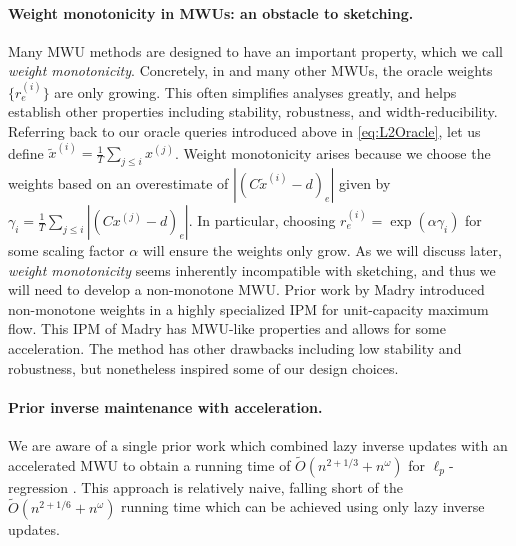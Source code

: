 \documentclass[11pt]{article}
\newcommand\dd{\boldsymbol{\mathit{d}}}
\newcommand\rr{\boldsymbol{\mathit{r}}}
\newcommand\xx{\boldsymbol{\mathit{x}}}
\newcommand\xxtil{\widetilde{\boldsymbol{\mathit{x}}}}
\newcommand\CC{\boldsymbol{\mathit{C}}}
\newcommand\Otil{\widetilde{O}}
\begin{document}
\paragraph{Weight monotonicity in MWUs: an obstacle to sketching.}
Many MWU methods are designed to have an important property, which we call \emph{weight monotonicity}.
Concretely, in \cite{christiano2011electrical} and many other MWUs, the oracle weights $\{\rr_e^{(i)}\}$ are only growing.
This often simplifies analyses greatly, and helps establish other properties including stability, robustness, and width-reducibility.
Referring back to our oracle queries introduced above in \eqref{eq:L2Oracle}, let us define
$\xxtil^{(i)} = \frac{1}{T}\sum_{j \leq i} \xx^{(j)}$.
Weight monotonicity arises because we choose the weights based on an overestimate of 
$|(\CC\xxtil^{(i)}-\dd)_e|$ given by $\gamma_i = \frac{1}{T}\sum_{j \leq i} |(\CC\xx^{(j)}-\dd)_e|$.
In particular, choosing $\rr_e^{(i)}= \exp(\alpha \gamma_i)$ for some scaling factor $\alpha$ 
will ensure the weights only grow.
As we will discuss later, \emph{weight monotonicity} seems inherently incompatible with sketching, and thus we will need to develop a non-monotone MWU.
Prior work by Madry \cite{M13,madry2016computing} introduced non-monotone weights in a highly specialized IPM for unit-capacity maximum flow.
This IPM of Madry has MWU-like properties and allows for some acceleration.
The method has other drawbacks including low stability and robustness, but nonetheless inspired some of our design choices.

\paragraph{Prior inverse maintenance with acceleration.}
We are aware of a single prior work which combined lazy inverse updates with an accelerated MWU to obtain a running time of 
$\Otil(n^{2+1/3}+n^\omega)$ for $\ell_{p}$-regression \cite{adil2019iterative}.
This approach is relatively naive, falling short of 
the $\Otil(n^{2+1/6}+n^\omega)$ running time which can be achieved using only lazy inverse updates.
\end{document}
